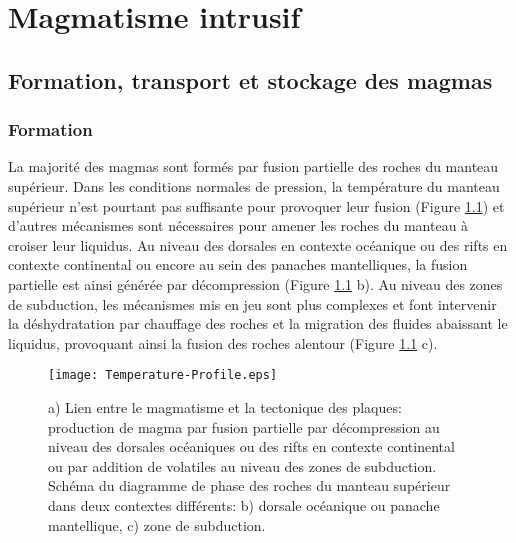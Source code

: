 \chapter{Magmatisme intrusif}
\label{chap1}
\minitoc

\section{Formation, transport et stockage des magmas}
\label{C1-sec:magm-intr-un}

\subsection{Formation}
\label{C1-sec:formation-1}

La majorité des magmas sont formés  par fusion partielle des roches du
manteau  supérieur.   Dans les  conditions  normales  de pression,  la
température du  manteau supérieur  n'est pourtant pas  suffisante pour
provoquer leur  fusion (Figure \ref{C1-Geoterme}) et  d'autres mécanismes
sont  nécessaires pour  amener les  roches du  manteau à  croiser leur
liquidus.  Au niveau  des dorsales en contexte océanique  ou des rifts
en contexte continental  ou encore au sein  des panaches mantelliques,
la  fusion  partielle  est  ainsi  générée  par  décompression  (Figure
\ref{C1-Geoterme} b).  Au niveau des  zones de subduction, les mécanismes
mis en jeu  sont plus complexes et font  intervenir la déshydratation
par chauffage des roches et la migration des fluides abaissant le
liquidus, provoquant ainsi la fusion des roches alentour (Figure
\ref{C1-Geoterme} c).

\begin{figure}[htpb]
  \begin{center}
    \graphicspath{ {/Users/thorey/Documents/These/Manuscript/Figure/Chapter1/} }
    \texttt{[image: Temperature-Profile.eps]}
    \caption{a) Lien entre le magmatisme et la tectonique des plaques:
      production de  magma par  fusion partielle par  décompression au
      niveau  des  dorsales  océaniques   ou  des  rifts  en  contexte
      continental ou par addition de  volatiles au niveau des zones de
      subduction. Schéma du  diagramme de phase des  roches du manteau
      supérieur dans  deux contextes différents: b)  dorsale océanique
      ou panache mantellique, c) zone de subduction.}
    \label{C1-Geoterme}
  \end{center}
\end{figure}

